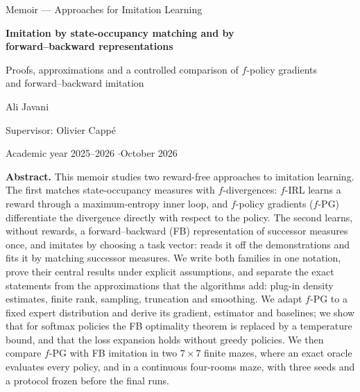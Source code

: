 \hypersetup{pageanchor=false}
\begin{titlepage}
\centering
\vspace*{2.5cm}
{\Large Memoir --- Approaches for Imitation Learning\par}
\vspace{1.2cm}
{\LARGE\bfseries Imitation by state-occupancy matching and by\\[2pt] forward--backward representations\par}
\vspace{0.5cm}
{\large Proofs, approximations and a controlled comparison of $f$-policy gradients\\ and forward--backward imitation\par}
\vspace{1.5cm}
{\large Ali Javani\par}
\vspace{0.4cm}
{Supervisor: Olivier Cappé\par}
\vspace{0.4cm}
{Academic year 2025--2026 \quad$\cdot$\quad October 2026\par}
\vfill
\begin{minipage}{0.86\textwidth}
\small
\textbf{Abstract.}
This memoir studies two reward-free approaches to imitation learning.
The first matches state-occupancy measures with $f$-divergences: $f$-IRL learns a reward through a maximum-entropy inner loop, and $f$-policy gradients ($f$-PG) differentiate the divergence directly with respect to the policy.
The second learns, without rewards, a forward--backward (FB) representation of successor measures once, and imitates by choosing a task vector: \ERFB{} reads it off the demonstrations and \DMFB{} fits it by matching successor measures.
We write both families in one notation, prove their central results under explicit assumptions, and separate the exact statements from the approximations that the algorithms add: plug-in density estimates, finite rank, sampling, truncation and smoothing.
We adapt $f$-PG to a fixed expert distribution and derive its gradient, estimator and baselines; we show that for softmax policies the FB optimality theorem is replaced by a temperature bound, and that the \DMFB{} loss expansion holds without greedy policies.
We then compare $f$-PG with FB imitation in two $7\times7$ finite mazes, where an exact oracle evaluates every policy, and in a continuous four-rooms maze, with three seeds and a protocol frozen before the final runs.

\end{minipage}
\end{titlepage}
